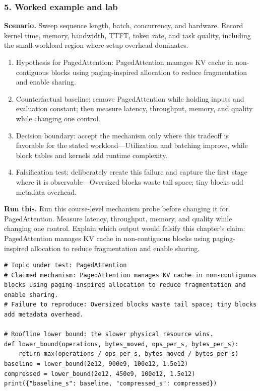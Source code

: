 \subsubsection*{5. Worked example and lab}
\textbf{Scenario.} Sweep sequence length, batch, concurrency, and hardware. Record kernel time, memory, bandwidth, TTFT, token rate, and task quality, including the small-workload region where setup overhead dominates.
\begin{enumerate}
\item Hypothesis for PagedAttention: PagedAttention manages KV cache in non-contiguous blocks using paging-inspired allocation to reduce fragmentation and enable sharing.
\item Counterfactual baseline: remove PagedAttention while holding inputs and evaluation constant; then measure latency, throughput, memory, and quality while changing one control.
\item Decision boundary: accept the mechanism only where this tradeoff is favorable for the stated workload—Utilization and batching improve, while block tables and kernels add runtime complexity.
\item Falsification test: deliberately create this failure and capture the first stage where it is observable—Oversized blocks waste tail space; tiny blocks add metadata overhead.
\end{enumerate}
\textbf{Run this.} Run this course-level mechanism probe before changing it for PagedAttention. Measure latency, throughput, memory, and quality while changing one control. Explain which output would falsify this chapter's claim: PagedAttention manages KV cache in non-contiguous blocks using paging-inspired allocation to reduce fragmentation and enable sharing.
\begin{Verbatim}[fontsize=\scriptsize]
# Topic under test: PagedAttention
# Claimed mechanism: PagedAttention manages KV cache in non-contiguous blocks using paging-inspired allocation to reduce fragmentation and enable sharing.
# Failure to reproduce: Oversized blocks waste tail space; tiny blocks add metadata overhead.

# Roofline lower bound: the slower physical resource wins.
def lower_bound(operations, bytes_moved, ops_per_s, bytes_per_s):
    return max(operations / ops_per_s, bytes_moved / bytes_per_s)
baseline = lower_bound(2e12, 900e9, 100e12, 1.5e12)
compressed = lower_bound(2e12, 450e9, 100e12, 1.5e12)
print({"baseline_s": baseline, "compressed_s": compressed})
\end{Verbatim}
